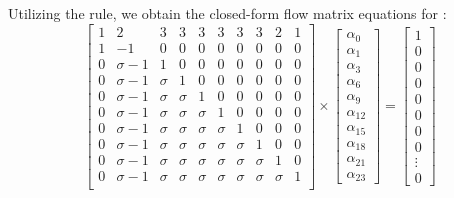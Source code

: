 Utilizing the rule, we obtain the closed-form flow matrix equations for :
\begin{equation}
{
\left[ \begin{array}{cccccccccc}
1 & 2 & 3 & 3 & 3 & 3 & 3 & 3 & 2 & 1\\
1 & -1 & 0 & 0 & 0 & 0 & 0 & 0 & 0 & 0\\
0 & \sigma-1 & 1 & 0 & 0 & 0 & 0 & 0 & 0 & 0 \\
0 & \sigma-1 & \sigma & 1 & 0 & 0 & 0 & 0 & 0 & 0 \\
0 & \sigma-1 & \sigma & \sigma & 1 & 0 & 0 & 0 & 0 & 0\\
0 & \sigma-1 & \sigma & \sigma & \sigma & 1 & 0 & 0 & 0 & 0\\
0 & \sigma-1 & \sigma & \sigma & \sigma & \sigma & 1 & 0 & 0 & 0\\
0 & \sigma-1 & \sigma & \sigma & \sigma & \sigma & \sigma & 1 & 0 & 0\\
0 & \sigma-1 & \sigma & \sigma & \sigma & \sigma & \sigma & \sigma & 1 & 0\\
0 & \sigma-1 & \sigma & \sigma & \sigma & \sigma & \sigma & \sigma & \sigma & 1 \\
\end{array} 
\right ]} \times \left[ \begin{array}{c}
\alpha_{0} \\
\alpha_{1} \\
\alpha_{3} \\
\alpha_{6} \\
\alpha_{9} \\
\alpha_{12}\\
\alpha_{15}\\
\alpha_{18}\\
\alpha_{21}\\
\alpha_{23}
\end{array} 
\right ] = \left[ \begin{array}{c}
1 \\
0 \\
0 \\
0 \\
0 \\
0 \\
0 \\
0 \\
\vdots \\
0
\end{array} 
\right ]
\end{equation}

